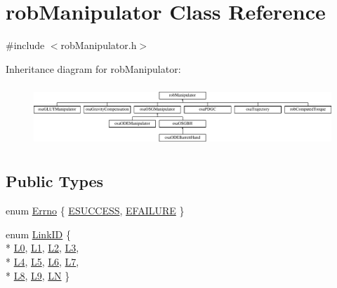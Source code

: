 \hypertarget{classrob_manipulator}{\section{rob\-Manipulator Class Reference}
\label{classrob_manipulator}
}


{\ttfamily \#include $<$rob\-Manipulator.\-h$>$}

Inheritance diagram for rob\-Manipulator\-:\begin{figure}[H]
\begin{center}
\leavevmode
\includegraphics[height=2.333333cm]{d8/dc2/classrob_manipulator}
\end{center}
\end{figure}
\subsection*{Public Types}
\begin{DoxyCompactItemize}
\item 
enum \hyperlink{classrob_manipulator_a7bbb51cdb81c9c681075a9274ca0cdc0}{Errno} \{ \hyperlink{classrob_manipulator_a7bbb51cdb81c9c681075a9274ca0cdc0a4c226980d6ea8bac5c424a7d1422fc32}{E\-S\-U\-C\-C\-E\-S\-S}, 
\hyperlink{classrob_manipulator_a7bbb51cdb81c9c681075a9274ca0cdc0ab432cb0d5e98e3743f43b7d5053079ae}{E\-F\-A\-I\-L\-U\-R\-E}
 \}
\item 
enum \hyperlink{classrob_manipulator_ad3b2499e7a137e7aa0e5d3a9c6277b30}{Link\-I\-D} \{ \\*
\hyperlink{classrob_manipulator_ad3b2499e7a137e7aa0e5d3a9c6277b30a8db2978612d88b9625029a8dc8700079}{L0}, 
\hyperlink{classrob_manipulator_ad3b2499e7a137e7aa0e5d3a9c6277b30a09b660bf4983750da3f96c0841269f29}{L1}, 
\hyperlink{classrob_manipulator_ad3b2499e7a137e7aa0e5d3a9c6277b30aaa5b5f30d0cc3fd2d0ea0729ce60fb6f}{L2}, 
\hyperlink{classrob_manipulator_ad3b2499e7a137e7aa0e5d3a9c6277b30afdfab6a3ec7ece9ec932937d5984e877}{L3}, 
\\*
\hyperlink{classrob_manipulator_ad3b2499e7a137e7aa0e5d3a9c6277b30abb1585b727ddf3f5bb71a60cbf58881a}{L4}, 
\hyperlink{classrob_manipulator_ad3b2499e7a137e7aa0e5d3a9c6277b30a8e3ccf775bd8fb92c8bac84a3f835b70}{L5}, 
\hyperlink{classrob_manipulator_ad3b2499e7a137e7aa0e5d3a9c6277b30a5acb05ce8f8e46621a85ad571b0abfc9}{L6}, 
\hyperlink{classrob_manipulator_ad3b2499e7a137e7aa0e5d3a9c6277b30a06ebad2979154d92b8637ad6865c95c5}{L7}, 
\\*
\hyperlink{classrob_manipulator_ad3b2499e7a137e7aa0e5d3a9c6277b30a59b012b4594df5d7a514e1a729954345}{L8}, 
\hyperlink{classrob_manipulator_ad3b2499e7a137e7aa0e5d3a9c6277b30ae63bc29ff37d5aa09a2edfb4dc335dd0}{L9}, 
\hyperlink{classrob_manipulator_ad3b2499e7a137e7aa0e5d3a9c6277b30ae8cc0a5b766014b0550ed4b3cf8db13e}{L\-N}
 \}
\end{DoxyCompactItemize}
